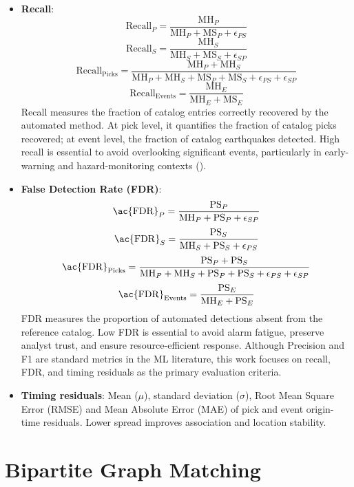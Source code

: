 \begin{itemize}
  \item \textbf{Recall}:
    $$\mathrm{Recall}_P = \dfrac{\mathrm{MH}_P}{\mathrm{MH}_P +
    \mathrm{MS}_P + \epsilon_{PS}}$$
    $$\mathrm{Recall}_S = \dfrac{\mathrm{MH}_S}{\mathrm{MH}_S +
    \mathrm{MS}_S + \epsilon_{SP}}$$
    $$\mathrm{Recall}_{\text{Picks}} = \dfrac{\mathrm{MH}_P +
    \mathrm{MH}_S}{\mathrm{MH}_P + \mathrm{MH}_S + \mathrm{MS}_P +
    \mathrm{MS}_S + \epsilon_{PS} + \epsilon_{SP}}$$
    $$\mathrm{Recall}_{\text{Events}} =
    \dfrac{\mathrm{MH}_E}{\mathrm{MH}_E + \mathrm{MS}_E}$$
    Recall measures the fraction of catalog entries correctly recovered by
    the automated method. At pick level, it quantifies the fraction of catalog
    picks recovered; at event level, the fraction of catalog earthquakes
    detected. High recall is essential to avoid overlooking significant events,
    particularly in early-warning and hazard-monitoring contexts
    (\cite{SeismicPhaseDetection}).
  \item \textbf{False Detection Rate (\ac{FDR})}:
    $$\mathrm{\ac{FDR}}_P = \dfrac{\mathrm{PS}_P}{\mathrm{MH}_P +
    \mathrm{PS}_P + \epsilon_{SP}}$$
    $$\mathrm{\ac{FDR}}_S = \dfrac{\mathrm{PS}_S}{\mathrm{MH}_S +
    \mathrm{PS}_S + \epsilon_{PS}}$$
    $$\mathrm{\ac{FDR}}_{\text{Picks}} = \dfrac{\mathrm{PS}_P +
    \mathrm{PS}_S}{\mathrm{MH}_P + \mathrm{MH}_S + \mathrm{PS}_P +
    \mathrm{PS}_S + \epsilon_{PS} + \epsilon_{SP}}$$
    $$\mathrm{\ac{FDR}}_{\text{Events}} =
    \dfrac{\mathrm{PS}_E}{\mathrm{MH}_E + \mathrm{PS}_E}$$
    \ac{FDR} measures the proportion of automated detections absent from the
    reference catalog. Low \ac{FDR} is essential to avoid alarm fatigue,
    preserve analyst trust, and ensure resource-efficient response. Although
    Precision and F1 are standard metrics in the \ac{ML} literature, this
    work focuses on recall, \ac{FDR}, and timing residuals as the primary
    evaluation criteria.
  \item \textbf{Timing residuals}: Mean ($\mu$), standard deviation ($\sigma$),
    Root Mean Square Error (RMSE) and Mean Absolute Error (MAE) of pick and
    event origin-time residuals. Lower spread improves association and location
    stability.
\end{itemize}

\section{Bipartite Graph Matching}

